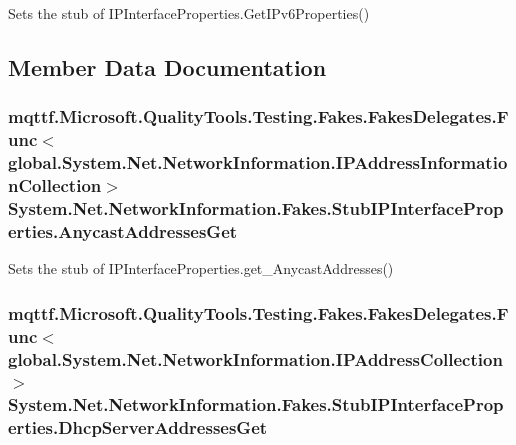 Sets the stub of I\-P\-Interface\-Properties.\-Get\-I\-Pv6\-Properties()



\subsection{Member Data Documentation}
\hypertarget{class_system_1_1_net_1_1_network_information_1_1_fakes_1_1_stub_i_p_interface_properties_a995dc26ae56e249e9882ac3858bde2c7}{
\subsubsection[{Anycast\-Addresses\-Get}]{\setlength{\rightskip}{0pt plus 5cm}mqttf.\-Microsoft.\-Quality\-Tools.\-Testing.\-Fakes.\-Fakes\-Delegates.\-Func$<$global.\-System.\-Net.\-Network\-Information.\-I\-P\-Address\-Information\-Collection$>$ System.\-Net.\-Network\-Information.\-Fakes.\-Stub\-I\-P\-Interface\-Properties.\-Anycast\-Addresses\-Get}}\label{class_system_1_1_net_1_1_network_information_1_1_fakes_1_1_stub_i_p_interface_properties_a995dc26ae56e249e9882ac3858bde2c7}


Sets the stub of I\-P\-Interface\-Properties.\-get\-\_\-\-Anycast\-Addresses()

\hypertarget{class_system_1_1_net_1_1_network_information_1_1_fakes_1_1_stub_i_p_interface_properties_ad7502b2e55c51b73fa2f81482b52f49c}{
\subsubsection[{Dhcp\-Server\-Addresses\-Get}]{\setlength{\rightskip}{0pt plus 5cm}mqttf.\-Microsoft.\-Quality\-Tools.\-Testing.\-Fakes.\-Fakes\-Delegates.\-Func$<$global.\-System.\-Net.\-Network\-Information.\-I\-P\-Address\-Collection$>$ System.\-Net.\-Network\-Information.\-Fakes.\-Stub\-I\-P\-Interface\-Properties.\-Dhcp\-Server\-Addresses\-Get}}\label{class_system_1_1_net_1_1_network_information_1_1_fakes_1_1_stub_i_p_interface_properties_ad7502b2e55c51b73fa2f81482b52f49c}


